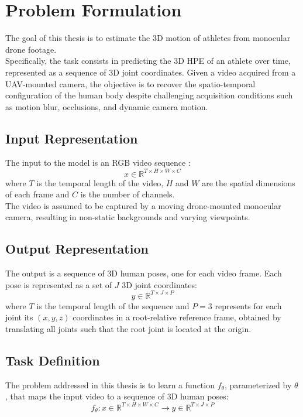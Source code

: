 \chapter{Problem Formulation}
The goal of this thesis is to estimate the 3D motion of athletes from monocular drone footage.\\ 
Specifically, the task consists in predicting the 3D HPE of an athlete over time, represented as a sequence of 3D joint coordinates.
Given a video acquired from a UAV-mounted camera, the objective is to recover the spatio-temporal configuration of the human body despite challenging acquisition conditions such as motion blur, occlusions, and dynamic camera motion.


\section{Input Representation}
The input to the model is an RGB video sequence :
\begin{equation}
    x \in \mathbb{R}^{T \times H \times W \times C}
\end{equation}
where $T$ is the temporal length of the video, $H$ and $W$ are the spatial dimensions of each frame and $C$ is the number of channels.\\
The video is assumed to be captured by a moving drone-mounted monocular camera, resulting in non-static backgrounds and varying viewpoints.


\section{Output Representation}
The output is a sequence of 3D human poses, one for each video frame. 
Each pose is represented as a set of $J$ 3D joint coordinates:
\begin{equation}
    y \in \mathbb{R}^{T \times J \times P}
\end{equation}
where $T$ is the temporal length of the sequence and $P = 3$ represents for each joint its $(x, y, z)$ coordinates in a root-relative reference frame, obtained by translating all joints such that the root joint is located at 
the origin.


\section{Task Definition}
The problem addressed in this thesis is to learn a function $f_\theta$, parameterized by $\theta$, that maps the input video to a sequence of 3D human poses:
\begin{equation}
    f_\theta: x \in \mathbb{R}^{T \times H \times W \times C} \rightarrow y \in \mathbb{R}^{T \times J \times P}
\end{equation}


